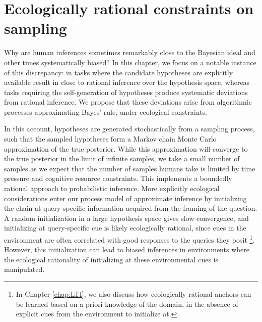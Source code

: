 
\chapter{Ecologically rational constraints on sampling}
\label{chap:MCMC}

Why are human inferences sometimes remarkably close to the Bayesian ideal and other times systematically biased? In this chapter, we focus on a notable instance of this discrepancy: in tasks where the candidate hypotheses are explicitly available result in close to rational inference over the hypothesis space, whereas tasks requiring the self-generation of hypotheses produce systematic deviations from rational inference. We propose that these deviations arise from algorithmic processes approximating Bayes’ rule, under ecological constraints.

In this account, hypotheses are generated stochastically from a sampling process, such that the sampled hypotheses form a Markov chain Monte Carlo approximation of the true posterior. While this approximation will converge to the true posterior in the limit of infinite samples, we take a small number of samples as we expect that the number of samples humans take is limited by time pressure and cognitive resource constraints. This implements a boundedly rational approach to probabilistic inference. More explicitly ecological considerations enter our process model of approximate inference by initializing the chain at query-specific information acquired from the framing of the question. A random initialization in a large hypothesis space gives slow convergence, and initializing at query-specific cue is likely ecologically rational, since cues in the environment are often correlated with good responses to the queries they posit \footnote{In Chapter \ref{chap:LTI}, we also discuss how ecologically rational anchors can be learned based on a priori knowledge of the domain, in the absence of explicit cues from the environment to initialize at.}. However, this initialization can lead to biased inferences in environments where the ecological rationality of initializing at these environmental cues is manipulated. 

